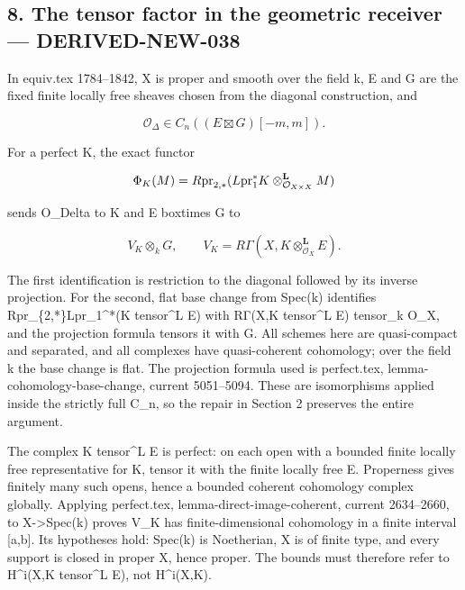 \documentclass[11pt]{article}
\begin{document}
\subsection{8. The tensor factor in the geometric receiver --- DERIVED-NEW-038}\label{proofs-10691-11108-the-tensor-factor-in-the-geometric-receiver-derived-new-038}

In equiv.tex 1784–\allowbreak{}1842,\allowbreak{} X is proper and smooth over the field k,\allowbreak{} E and G are the fixed finite locally free sheaves chosen from the diagonal construction,\allowbreak{} and

\[
 \mathcal O_\Delta\in C_n((E\boxtimes G)[-m,m]).
\]

For a perfect K,\allowbreak{} the exact functor

\[
 \Phi_K(M)=R{\rm pr}_{2,*}(L{\rm pr}_1^*K
                   \otimes_{\mathcal O_{X\times X}}^{\mathbf L}M)
\]

sends O\_\allowbreak{}Delta to K and E boxtimes G to

\[
 V_K\otimes_k G,\qquad
 V_K=R\Gamma(X,K\otimes_{\mathcal O_X}^{\mathbf L}E).
\]

The first identification is restriction to the diagonal followed by its inverse projection. For the second,\allowbreak{} flat base change from Spec(k)\allowbreak{} identifies Rpr\_\allowbreak{}\{2,\allowbreak{}*\}Lpr\_\allowbreak{}1\textasciicircum{}*(K tensor\^{}L E)\allowbreak{} with RΓ(X,\allowbreak{}K tensor\^{}L E)\allowbreak{} tensor\_\allowbreak{}k O\_\allowbreak{}X,\allowbreak{} and the projection formula tensors it with G. All schemes here are quasi-compact and separated,\allowbreak{} and all complexes have quasi-coherent cohomology; over the field k the base change is flat. The projection formula used is perfect.tex,\allowbreak{} lemma-cohomology-base-change,\allowbreak{} current 5051–\allowbreak{}5094. These are isomorphisms applied inside the strictly full C\_\allowbreak{}n,\allowbreak{} so the repair in Section 2 preserves the entire argument.

The complex K tensor\^{}L E is perfect:\allowbreak{} on each open with a bounded finite locally free representative for K,\allowbreak{} tensor it with the finite locally free E. Properness gives finitely many such opens,\allowbreak{} hence a bounded coherent cohomology complex globally. Applying perfect.tex,\allowbreak{} lemma-direct-image-coherent,\allowbreak{} current 2634–\allowbreak{}2660,\allowbreak{} to X\allowbreak{}->Spec(k)\allowbreak{} proves V\_\allowbreak{}K has finite-dimensional cohomology in a finite interval [a,\allowbreak{}b]\allowbreak{}. Its hypotheses hold:\allowbreak{} Spec(k)\allowbreak{} is Noetherian,\allowbreak{} X is of finite type,\allowbreak{} and every support is closed in proper X,\allowbreak{} hence proper. The bounds must therefore refer to H\textasciicircum{}i(X,\allowbreak{}K tensor\^{}L E)\allowbreak{},\allowbreak{} not H\textasciicircum{}i(X,\allowbreak{}K)\allowbreak{}.
\end{document}
